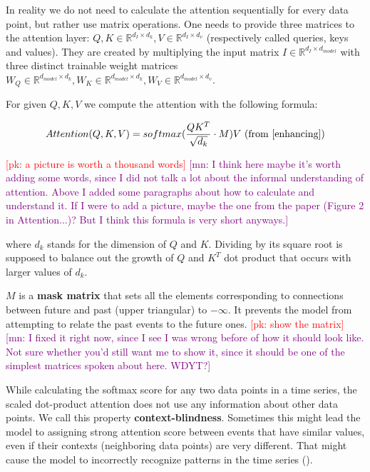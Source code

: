 \documentclass[en]{pracamgr}
\newcommand{\pk}[1]{\textcolor{red}{\small [pk: #1]}}
\newcommand{\mn}[1]{\textcolor{purple}{\small [mn: #1]}}
\begin{document}
In reality we do not need to calculate the attention sequentially for every data point, but rather use matrix operations.
One needs to provide three matrices to the attention layer: $Q, K \in \mathbb{R}^{d_I \times d_k}, V \in \mathbb{R}^{d_I \times d_v}$ (respectively called queries, keys and values). They are created by multiplying the input matrix $I \in \mathbb{R}^{d_I \times d_{model}}$ with three distinct trainable weight matrices $W_Q \in \mathbb{R}^{d_{model} \times d_k}, W_K \in \mathbb{R}^{d_{model} \times d_k}, W_V \in \mathbb{R}^{d_{model} \times d_v}$.

For given $Q, K, V$ we compute the attention with the following formula:

$$ Attention(Q, K, V) = softmax(\frac{QK^{T}}{\sqrt{d_k}} \cdot M)V \textrm{ (from \cite{enhancing})} $$

\pk{a picture is worth a thousand words} \mn{I think here maybe it's worth adding some words, since I did not talk a lot about the informal understanding of attention. Above I added some paragraphs about how to calculate and understand it. If I were to add a picture, maybe the one from the paper (Figure 2 in Attention...)? But I think this formula is very short anyways.}

where $d_k$ stands for the dimension of $Q$ and $K$. Dividing by its square root is supposed to balance out the growth of $Q$ and $K^{T}$ dot product that occurs with larger values of $d_k$.

$M$ is a \textbf{mask matrix} that sets all the elements corresponding to connections between future and past (upper triangular) to $-\infty$. It prevents the model from attempting to relate the past events to the future ones. \pk{show the matrix} \mn{I fixed it right now, since I see I was wrong before of how it should look like. Not sure whether you'd still want me to show it, since it should be one of the simplest matrices spoken about here. WDYT?}




While calculating the softmax score for any two data points in a time series, the scaled dot-product attention does not use any information about other data points. We call this property \textbf{context-blindness}. Sometimes this might lead the model to assigning strong attention score between events that have similar values, even if their contexts (neighboring data points) are very different. That might cause the model to incorrectly recognize patterns in the time series (\cite{enhancing}).
\end{document}
